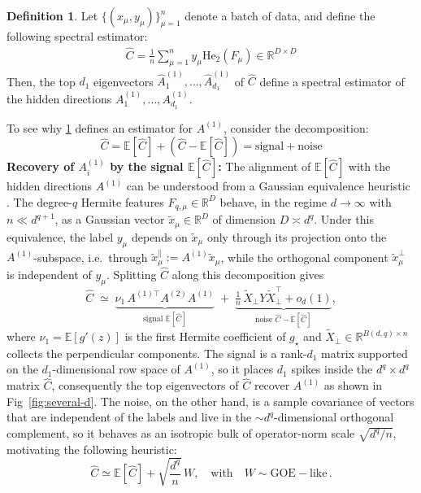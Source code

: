 \documentclass[]{article}
\numberwithin{equation}{section}
\theoremstyle{definition}
\newtheorem{definition}{Definition}[section]
\newcommand{\RR}{\mathbb{R}}
\newcommand{\EE}{\mathbb{E}}
\newcommand{\He}{\mathord{\mathrm{He}}}
\begin{document}
\begin{definition}
    Let $\{ (x_\mu, y_\mu) \} _{\mu=1}^{n}$ denote a batch of data, and define the following spectral estimator:
    \begin{align}
    \widehat{C} = \frac{1}{n} \sum_{\mu=1}^{n} y_\mu \He_2(F_{ \mu})\in\mathbb{R}^{D\times D}
    \end{align}
    Then, the top $d_{1}$ eigenvectors $\widehat A^{(1)}_{1}, \dots, \widehat A^{(1)}_{d_1}$ of $\widehat{C}$ define a spectral estimator of the hidden directions $A^{(1)}_{1}, \dots, A^{(1)}_{d_1}$. 
\label{def:estimator_1}
\end{definition}
To see why \cref{def:estimator_1} defines an estimator for $A^{(1)}$, consider the decomposition:
\begin{equation}
    \widehat{C} = \EE[\widehat{C}] + (\widehat{C} - \EE[\widehat{C}]) = \mathrm{signal} + \mathrm{noise}
\end{equation}
\textbf{Recovery of $A^{(1)}_i$ by the signal $\EE[\widehat{C}]$:}
The alignment of $\EE[\widehat{C}]$ with the hidden directions $A^{(1)}$ can be understood from a Gaussian equivalence heuristic \citep{tabanelli2026deep}. The degree-$q$ Hermite features $F_{q,\mu}\in\RR^{D}$ behave, in the regime $d\to\infty$ with $n\ll d^{q+1}$, as a Gaussian vector $\tilde{x}_\mu\in\RR^{D}$ of dimension $D\asymp d^q$. Under this equivalence, the label $y_\mu$ depends on $\tilde{x}_\mu$ only through its projection onto the $A^{(1)}$-subspace, i.e.\ through $\tilde{x}^{\parallel}_\mu := A^{(1)}\tilde{x}_\mu$, while the orthogonal component $\tilde{x}^{\perp}_\mu$ is independent of $y_\mu$. Splitting $\widehat{C}$ along this decomposition gives
\begin{equation}
    \widehat{C} \;\simeq\; \underbrace{\nu_1\, A^{(1)\top} A^{(2)} A^{(1)}}_{\text{signal } \EE[\widehat{C}]} \;+\; \underbrace{\tfrac{1}{n}\,\tilde{X}_\perp Y \tilde{X}_\perp^{\top} + o_d(1)}_{\text{noise } \widehat{C}-\EE[\widehat{C}]},
\end{equation}
where $\nu_1=\mathbb{E}[g'(z)]$ is the first Hermite coefficient of $g_\star$ and $\tilde{X}_\perp\in\RR^{B(d,q)\times n}$ collects the perpendicular components. The signal is a rank-$d_1$ matrix supported on the $d_1$-dimensional row space of $A^{(1)}$, so it places $d_1$ spikes inside the $d^q\times d^q$ matrix $\widehat{C}$, consequently the top eigenvectors of $\widehat{C}$ recover $A^{(1)}$ as shown in Fig~\ref{fig:several-d}. The noise, on the other hand, is a sample covariance of vectors that are independent of the labels and live in the $\sim d^q$-dimensional orthogonal complement, so it behaves as an isotropic bulk of operator-norm scale $\sqrt{d^q/n}$, motivating the following heuristic:
\begin{equation}
    \widehat{C} \simeq \EE[\widehat{C}] + \sqrt{\dfrac{d^{q}}{n}}\, W, \quad \mathrm{with}\quad W\sim \mathrm{GOE-like}\,.
    \label{eq:signal_vs_noise_heuristic}
\end{equation}
\end{document}

